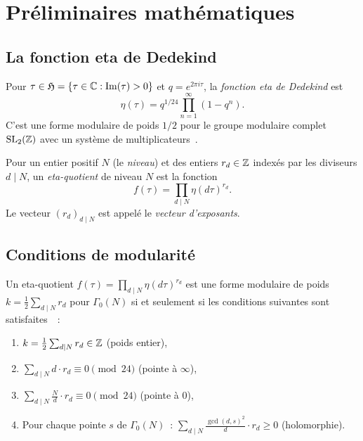 \section{Préliminaires mathématiques}
\label{sec:math_prelim}

\subsection{La fonction eta de Dedekind}

\begin{definition}
\label{def:dedekind_eta}
Pour $\tau \in \mathfrak{H} = \{\tau \in \mathbb{C} : \mathrm{Im}(\tau) > 0\}$ et $q = e^{2\pi i \tau}$, la \emph{fonction eta de Dedekind} est
\begin{equation}
  \eta(\tau) = q^{1/24} \prod_{n=1}^{\infty} (1 - q^n).
\end{equation}
C'est une forme modulaire de poids $1/2$ pour le groupe modulaire complet $\mathrm{SL}_2(\mathbb{Z})$ avec un système de multiplicateurs~\cite{ono2004}.
\end{definition}

\begin{definition}
\label{def:eta_quotient}
Pour un entier positif $N$ (le \emph{niveau}) et des entiers $r_d \in \mathbb{Z}$ indexés par les diviseurs $d \mid N$, un \emph{eta-quotient} de niveau $N$ est la fonction
\begin{equation}
  f(\tau) = \prod_{d \mid N} \eta(d\tau)^{r_d}.
\end{equation}
Le vecteur $(r_d)_{d \mid N}$ est appelé le \emph{vecteur d'exposants}.
\end{definition}

\subsection{Conditions de modularité}

Un eta-quotient $f(\tau) = \prod_{d \mid N} \eta(d\tau)^{r_d}$ est une forme modulaire de poids $k = \frac{1}{2}\sum_{d \mid N} r_d$ pour $\Gamma_0(N)$ si et seulement si les conditions suivantes sont satisfaites~\cite{ono2004,martin_1996}~:
\begin{enumerate}[label=(M\arabic*)]
  \item $k = \frac{1}{2}\sum_{d \mid N} r_d \in \mathbb{Z}$ \hfill (poids entier),
  \item $\sum_{d \mid N} d \cdot r_d \equiv 0 \pmod{24}$ \hfill (pointe à $\infty$),
  \item $\sum_{d \mid N} \frac{N}{d} \cdot r_d \equiv 0 \pmod{24}$ \hfill (pointe à $0$),
  \item Pour chaque pointe $s$ de $\Gamma_0(N)$~: $\sum_{d \mid N} \frac{\gcd(d,s)^2}{d} \cdot r_d \geq 0$ \hfill (holomorphie).
\end{enumerate}

